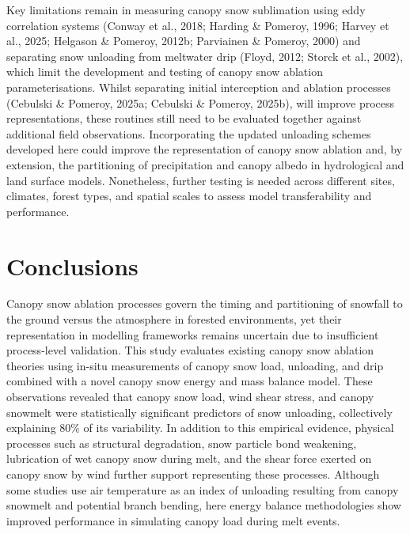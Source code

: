 \documentclass[
  letterpaper,
]{tex/uofsthesis-cs}
\begin{document}
Key limitations remain in measuring canopy snow sublimation using eddy
correlation systems (Conway et al., 2018; Harding \& Pomeroy, 1996;
Harvey et al., 2025; Helgason \& Pomeroy, 2012b; Parviainen \& Pomeroy,
2000) and separating snow unloading from meltwater drip (Floyd, 2012;
Storck et al., 2002), which limit the development and testing of canopy
snow ablation parameterisations. Whilst separating initial interception
and ablation processes (Cebulski \& Pomeroy, 2025a; Cebulski \& Pomeroy,
2025b), will improve process representations, these routines still need
to be evaluated together against additional field observations.
Incorporating the updated unloading schemes developed here could improve
the representation of canopy snow ablation and, by extension, the
partitioning of precipitation and canopy albedo in hydrological and land
surface models. Nonetheless, further testing is needed across different
sites, climates, forest types, and spatial scales to assess model
transferability and performance.

\section{Conclusions}\label{conclusions-2}

Canopy snow ablation processes govern the timing and partitioning of
snowfall to the ground versus the atmosphere in forested environments,
yet their representation in modelling frameworks remains uncertain due
to insufficient process-level validation. This study evaluates existing
canopy snow ablation theories using in-situ measurements of canopy snow
load, unloading, and drip combined with a novel canopy snow energy and
mass balance model. These observations revealed that canopy snow load,
wind shear stress, and canopy snowmelt were statistically significant
predictors of snow unloading, collectively explaining 80\% of its
variability. In addition to this empirical evidence, physical processes
such as structural degradation, snow particle bond weakening,
lubrication of wet canopy snow during melt, and the shear force exerted
on canopy snow by wind further support representing these processes.
Although some studies use air temperature as an index of unloading
resulting from canopy snowmelt and potential branch bending, here energy
balance methodologies show improved performance in simulating canopy
load during melt events.
\end{document}
